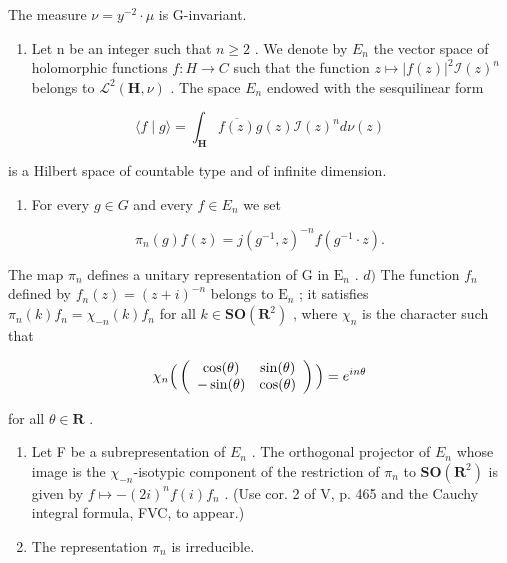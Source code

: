 The measure \(\nu = y^{-2} \cdot \mu\) is G-invariant.

\begin{enumerate}
\def\labelenumi{\alph{enumi})}
\setcounter{enumi}{1}
\tightlist
\item
  Let n be an integer such that \(n \geqslant 2\) . We denote by \(E_{n}\) the vector space of holomorphic functions \(f: H \to C\) such that the function \(z \mapsto |f(z)|^{2} \mathcal{I}(z)^{n}\) belongs to \(\mathcal{L}^{2}(\mathbf{H}, \nu)\) . The space \(E_{n}\) endowed with the sesquilinear form
\end{enumerate}

\[
\langle f \mid g \rangle = \int_ {\mathbf {H}} \overline {{f (z)}} g (z) \mathcal {I} (z) ^ {n} d \nu (z)
\]

is a Hilbert space of countable type and of infinite dimension.

\begin{enumerate}
\def\labelenumi{\alph{enumi})}
\setcounter{enumi}{2}
\tightlist
\item
  For every \(g \in G\) and every \(f \in E_{n}\) we set
\end{enumerate}

\[
\pi_ {n} (g) f (z) = j (g ^ {- 1}, z) ^ {- n} f (g ^ {- 1} \cdot z).
\]

The map \(\pi_n\) defines a unitary representation of G in \(\mathrm{E}_n\) . \(d)\) The function \(f_n\) defined by \(f_n(z) = (z + i)^{-n}\) belongs to \(\mathrm{E}_n\) ; it satisfies \(\pi_n(k)f_n = \chi_{-n}(k)f_n\) for all \(k \in \mathbf{SO}(\mathbf{R}^2)\) , where \(\chi_n\) is the character such that

\[
\chi_ {n} \Big (\left( \begin{array}{c c} \cos (\theta) & \sin (\theta) \\ - \sin (\theta) & \cos (\theta) \end{array} \right) \Big) = e ^ {i n \theta}
\]

for all \(\theta\in\mathbf{R}\) .

\begin{enumerate}
\def\labelenumi{\alph{enumi})}
\setcounter{enumi}{4}
\item
  Let F be a subrepresentation of \(E_{n}\) . The orthogonal projector of \(E_{n}\) whose image is the \(\chi_{-n}\)-isotypic component of the restriction of \(\pi_{n}\) to \(\mathbf{SO}(\mathbf{R}^{2})\) is given by \(f \mapsto -(2i)^{n}f(i)f_{n}\) . (Use cor. 2 of V, p. 465 and the Cauchy integral formula, FVC, to appear.)
\item
  The representation \(\pi_n\) is irreducible.
\end{enumerate}

